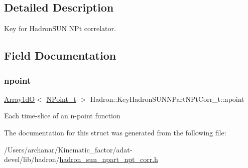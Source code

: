 \subsection{Detailed Description}
Key for Hadron\+S\+UN N\+Pt correlator. 

\subsection{Field Documentation}
\mbox{\label{structHadron_1_1KeyHadronSUNNPartNPtCorr__t_a1d5919dc89116837fc924188f3c604bc}} 
\subsubsection{\texorpdfstring{npoint}{npoint}}
{\footnotesize\ttfamily \mbox{\hyperlink{classADAT_1_1Array1dO}{Array1dO}}$<$ \mbox{\hyperlink{structHadron_1_1KeyHadronSUNNPartNPtCorr__t_1_1NPoint__t}{N\+Point\+\_\+t}} $>$ Hadron\+::\+Key\+Hadron\+S\+U\+N\+N\+Part\+N\+Pt\+Corr\+\_\+t\+::npoint}

Each time-\/slice of an n-\/point function 

The documentation for this struct was generated from the following file\+:\begin{DoxyCompactItemize}
\item 
/\+Users/archanar/\+Kinematic\+\_\+factor/adat-\/devel/lib/hadron/\mbox{\hyperlink{adat-devel_2lib_2hadron_2hadron__sun__npart__npt__corr_8h}{hadron\+\_\+sun\+\_\+npart\+\_\+npt\+\_\+corr.\+h}}\end{DoxyCompactItemize}
